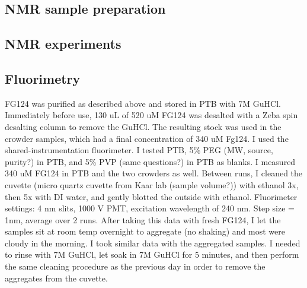 \subsection{NMR sample preparation}
\subsection{NMR experiments}
\subsection{Fluorimetry}

FG124 was purified as described above and stored in PTB with 7M GuHCl.  Immediately before use, 130 uL of 520 uM FG124 was desalted with a Zeba spin desalting column to remove the GuHCl.  The resulting stock was used in the crowder samples, which had a final concentration of 340 uM Fg124.  I used the shared-instrumentation fluorimeter.  I tested PTB, 5\% PEG (MW, source, purity?) in PTB, and 5\% PVP (same questions?) in PTB as blanks.  I measured 340 uM FG124 in PTB and the two crowders as well.  Between runs, I cleaned the cuvette (micro quartz cuvette from Kaar lab (sample volume?)) with ethanol 3x, then 5x with DI water, and gently blotted the outside with ethanol.  Fluorimeter settings: 4 nm slits, 1000 V PMT, excitation wavelength of 240 nm.  Step size  = 1nm, average over 2 runs.  After taking this data with fresh FG124, I let the samples sit at room temp overnight to aggregate (no shaking) and most were cloudy in the morning.  I took similar data with the aggregated samples.  I needed to rinse with 7M GuHCl, let soak in 7M GuHCl for 5 minutes, and then perform the same cleaning procedure as the previous day in order to remove the aggregates from the cuvette.


